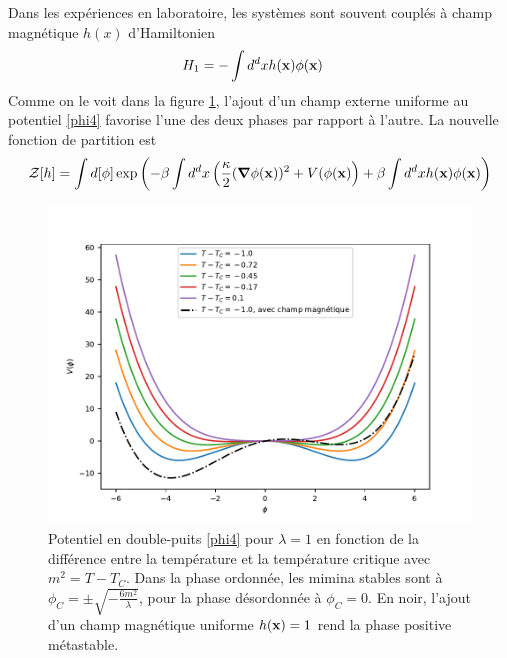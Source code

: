 Dans les expériences en laboratoire, les systèmes sont souvent couplés à champ magnétique $h(x)$ d'Hamiltonien
\begin{align}
    H_1 &= - \int d^dx h({\bf x})\phi({\bf x})
    \label{champ-externe}
\end{align}
Comme on le voit dans la figure \ref{double-puits-temperature}, l'ajout d'un champ externe uniforme au potentiel \ref{phi4} favorise l'une des deux phases par rapport à l'autre. La nouvelle fonction de partition est
\begin{align}
    \mathcal{Z}[h] = \int d [\phi] \exp \left( - \beta \int d^d x \left( \frac{\kappa}{2} ({\boldsymbol \nabla} \phi({\bf x}))^2 + V(\phi({\bf x}) \right) + \beta \int d^d x h({\bf x}) \phi({\bf x}) \right)
\end{align}

\begin{figure}
    \centering
    \includegraphics[width=0.6\linewidth]{intro/double-puit-en-fonction-temp.pdf}
    \caption{Potentiel en double-puits \ref{phi4} pour $\lambda=1$ en fonction de la différence entre la température et la température critique avec $m^2 = T-T_C$. Dans la phase ordonnée, les mimina stables sont à $\phi_C =\pm \sqrt{- \frac{6 m^2}{\lambda} } $, pour la phase désordonnée à $\phi_C = 0$. En noir, l'ajout d'un champ magnétique uniforme $h({\bf x}) = 1$ rend la phase positive métastable.}
    \label{double-puits-temperature}
\end{figure}

